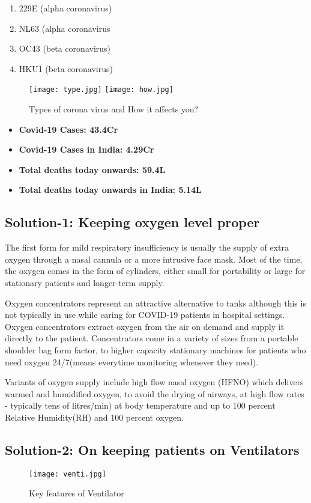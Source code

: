 \documentclass[12pts]{article}
\begin{document}
\begin{enumerate}
\item 229E (alpha coronavirus)
\item NL63 (alpha coronavirus
\item OC43 (beta coronavirus)
\item HKU1 (beta coronavirus)
\end{enumerate}
\begin{figure}[h]
\texttt{[image: type.jpg]}
\texttt{[image: how.jpg]}
\caption{Types of corona virus and How it affects you?}
\end{figure}

\begin{itemize}
\item \textbf{ Covid-19 Cases: 43.4Cr}
\item \textbf{ Covid-19 Cases in India: 4.29Cr}
\item \textbf{Total deaths today onwards: 59.4L}
\item \textbf{Total deaths today onwards in India: 5.14L}
\end{itemize} 


\subsection*{Solution-1: Keeping oxygen level proper}

The first form for mild respiratory insufficiency is usually the supply of extra oxygen through a nasal cannula or a more intrusive face mask. Most of the time, the oxygen comes in the form of cylinders, either small for portability or large for stationary patients and longer-term supply.

Oxygen concentrators represent an attractive alternative to tanks although this is not typically in use while caring for COVID-19 patients in hospital settings. Oxygen concentrators extract oxygen from the air on demand and supply it directly to the patient. Concentrators come in a variety of sizes from a portable shoulder bag form factor, to higher capacity stationary machines for patients who need oxygen 24/7(means everytime monitoring whenever they need).

Variants of oxygen supply include high flow nasal oxygen (HFNO) which delivers warmed and humidified oxygen, to avoid the drying of airways, at high flow rates - typically tens of litres/min) at body temperature and up to 100 percent Relative Humidity(RH) and 100 percent oxygen.

\subsection*{Solution-2:  On keeping patients on Ventilators}
\begin{figure}[h]
\centering
\texttt{[image: venti.jpg]}
\caption{Key features of Ventilator}
\end{figure}
\end{document}
